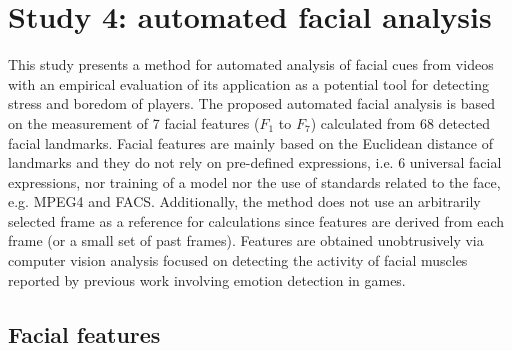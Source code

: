 \section{Study 4: automated facial analysis}
\label{s:study4}

This study presents a method for automated analysis of facial cues from videos with an empirical evaluation of its application as a potential tool for detecting stress and boredom of players. The proposed automated facial analysis is based on the measurement of 7 facial features ($F_1$ to $F_7$) calculated from 68 detected facial landmarks. Facial features are mainly based on the Euclidean distance of landmarks and they do not rely on pre-defined expressions, i.e. 6 universal facial expressions, nor training of a model nor the use of standards related to the face, e.g. MPEG4 and FACS. Additionally, the method does not use an arbitrarily selected frame as a reference for calculations since features are derived from each frame (or a small set of past frames). Features are obtained unobtrusively via computer vision analysis focused on detecting the activity of facial muscles reported by previous work involving emotion detection in games.


\subsection{Facial features}
\label{s:experiment1-study4-features-extraction}

